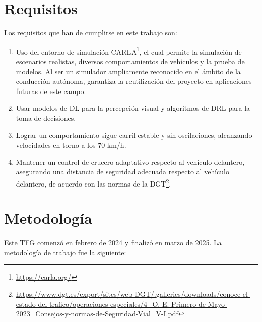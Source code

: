 \section{Requisitos}
\label{sec:requisitos}

Los requisitos que han de cumplirse en este trabajo son:
\begin{enumerate}
\item Uso del entorno de simulación CARLA\footnote{\url{https://carla.org/}}, el cual permite la simulación de escenarios realistas, diversos comportamientos de vehículos y la prueba de modelos. Al ser un simulador ampliamente reconocido en el ámbito de la conducción autónoma, garantiza la reutilización del proyecto en aplicaciones futuras de este campo.
\item Usar modelos de \ac{DL} para la percepción visual y algoritmos de \ac{DRL} para la toma de decisiones.
\item Lograr un comportamiento sigue-carril estable y sin oscilaciones, alcanzando velocidades en torno a los 70 km/h.
\item Mantener un control de crucero adaptativo respecto al vehículo delantero, asegurando una distancia de seguridad adecuada respecto al vehículo delantero, de acuerdo con las normas de la \ac{DGT}\footnote{\url{https://www.dgt.es/export/sites/web-DGT/.galleries/downloads/conoce-el-estado-del-trafico/operaciones-especiales/4_O.-E.-Primero-de-Mayo-2023_Consejos-y-normas-de-Seguridad-Vial_V-I.pdf}}.
\end{enumerate}

\section{Metodología}
\label{sec:metodologia}

Este TFG comenzó en febrero de 2024 y finalizó en marzo de 2025. La metodología de trabajo fue la siguiente:

